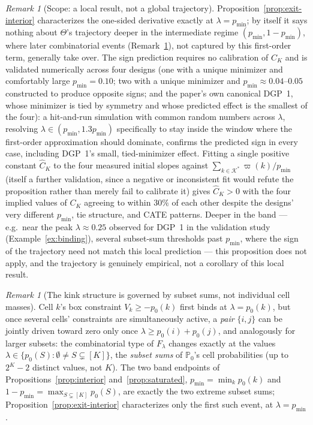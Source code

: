 \documentclass[11pt]{article}
\theoremstyle{plain}
\theoremstyle{definition}
\theoremstyle{remark}
\newtheorem{remark}[theorem]{Remark}
\newcommand{\PP}{\mathbb{P}}
\newcommand{\cK}{\mathcal{K}}
\begin{document}
\begin{remark}[Scope: a local result, not a global trajectory]\label{rem:exit-scope}
Proposition~\ref{prop:exit-interior} characterizes the one-sided derivative exactly
at $\lambda=p_{\min}$; by itself it says nothing about $\Theta$'s trajectory deeper
in the intermediate regime $(p_{\min},1-p_{\min})$, where later combinatorial events
(Remark~\ref{rem:kink-subset-sums}), not captured by this first-order term,
generally take over. The sign prediction requires no calibration of $C_K$ and is
validated numerically across four designs (one with a unique minimizer and
comfortably large $p_{\min}=0.10$; two with a unique minimizer and
$p_{\min}\approx0.04$--$0.05$ constructed to produce opposite signs; and the
paper's own canonical DGP~1, whose minimizer is tied by symmetry and whose
predicted effect is the smallest of the four): a hit-and-run simulation with common
random numbers across $\lambda$, resolving $\lambda\in(p_{\min},1.3p_{\min})$
specifically to stay inside the window where the first-order approximation should
dominate, confirms the predicted sign in every case, including DGP~1's small,
tied-minimizer effect. Fitting a single positive constant $\hat C_K$ to the four
measured initial slopes against $\sum_{k\in\cK^*}\varpi(k)/p_{\min}$ (itself a
further validation, since a negative or inconsistent fit would refute the
proposition rather than merely fail to calibrate it) gives $\hat C_K>0$ with the
four implied values of $C_K$ agreeing to within $30\%$ of each other despite the
designs' very different $p_{\min}$, tie structure, and CATE patterns. Deeper in the
band --- e.g.\ near the peak $\lambda\approx0.25$ observed for DGP~1 in the
validation study (Example~\ref{ex:binding}), several subset-sum thresholds past
$p_{\min}$, where the sign of the trajectory need not match this local prediction
--- this proposition does not apply, and the trajectory is genuinely empirical, not
a corollary of this local result.
\end{remark}

\begin{remark}[The kink structure is governed by subset sums, not individual cell
masses]\label{rem:kink-subset-sums}
Cell $k$'s box constraint $V_k\ge-p_0(k)$ first binds at $\lambda=p_0(k)$, but once
several cells' constraints are simultaneously active, a \emph{pair} $\{i,j\}$ can be
jointly driven toward zero only once $\lambda\ge p_0(i)+p_0(j)$, and analogously for
larger subsets: the combinatorial type of $F_\lambda$ changes exactly at the values
$\lambda\in\{p_0(S):\emptyset\ne S\subsetneq[K]\}$, the \emph{subset sums} of
$\PP_0$'s cell probabilities (up to $2^K-2$ distinct values, not $K$). The two band
endpoints of Propositions~\ref{prop:interior} and~\ref{prop:saturated},
$p_{\min}=\min_kp_0(k)$ and $1-p_{\min}=\max_{S\subsetneq[K]}p_0(S)$, are exactly the
two extreme subset sums; Proposition~\ref{prop:exit-interior} characterizes only the
first such event, at $\lambda=p_{\min}$.
\end{remark}
\end{document}
